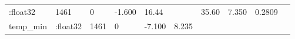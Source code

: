 \documentclass[]{article}
\begin{document}
\begin{longtable}[]{@{}llllllllll@{}}
\begin{minipage}[t]{0.11\columnwidth}
:float32\strut
\end{minipage} & \begin{minipage}[t]{0.06\columnwidth}\raggedright\strut
1461\strut
\end{minipage} & \begin{minipage}[t]{0.07\columnwidth}\raggedright\strut
0\strut
\end{minipage} & \begin{minipage}[t]{0.07\columnwidth}\raggedright\strut
-1.600\strut
\end{minipage} & \begin{minipage}[t]{0.07\columnwidth}\raggedright\strut
16.44\strut
\end{minipage} & \begin{minipage}[t]{0.04\columnwidth}\raggedright\strut
\strut
\end{minipage} & \begin{minipage}[t]{0.07\columnwidth}\raggedright\strut
35.60\strut
\end{minipage} & \begin{minipage}[t]{0.12\columnwidth}\raggedright\strut
7.350\strut
\end{minipage} & \begin{minipage}[t]{0.05\columnwidth}\raggedright\strut
0.2809\strut
\end{minipage}\tabularnewline
\begin{minipage}[t]{0.08\columnwidth}\raggedright\strut
temp\_min\strut
\end{minipage} & \begin{minipage}[t]{0.11\columnwidth}\raggedright\strut
:float32\strut
\end{minipage} & \begin{minipage}[t]{0.06\columnwidth}\raggedright\strut
1461\strut
\end{minipage} & \begin{minipage}[t]{0.07\columnwidth}\raggedright\strut
0\strut
\end{minipage} & \begin{minipage}[t]{0.07\columnwidth}\raggedright\strut
-7.100\strut
\end{minipage} & \begin{minipage}[t]{0.07\columnwidth}\raggedright\strut
8.235\strut
\end{minipage} & \begin{minipage}[t]{0.04\columnwidth}\raggedright\strut
\strut
\end{minipage} & \begin{minipage}[t]{0.07\columnwidth}\raggedright\strut

\end{minipage}
\end{longtable}
\end{document}
